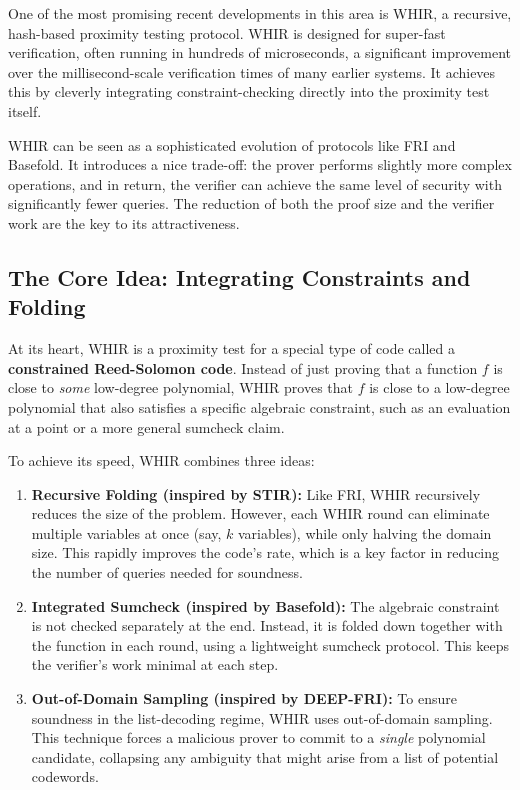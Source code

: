 \documentclass{article}
\begin{document}
One of the most promising recent developments in this area is WHIR, a recursive, hash-based proximity testing protocol. WHIR is designed for super-fast verification, often running in hundreds of microseconds, a significant improvement over the millisecond-scale verification times of many earlier systems. It achieves this by cleverly integrating constraint-checking directly into the proximity test itself.

WHIR can be seen as a sophisticated evolution of protocols like FRI and Basefold. It introduces a nice trade-off: the prover performs slightly more complex operations, and in return, the verifier can achieve the same level of security with significantly fewer queries. The reduction of both the proof size and the verifier work are the key to its attractiveness.

\subsection{The Core Idea: Integrating Constraints and Folding}

At its heart, WHIR is a proximity test for a special type of code called a \textbf{constrained Reed-Solomon code}. Instead of just proving that a function $f$ is close to \textit{some} low-degree polynomial, WHIR proves that $f$ is close to a low-degree polynomial that also satisfies a specific algebraic constraint, such as an evaluation at a point or a more general sumcheck claim.

To achieve its speed, WHIR combines three ideas:
\begin{enumerate}
    \item \textbf{Recursive Folding (inspired by STIR):} Like FRI, WHIR recursively reduces the size of the problem. However, each WHIR round can eliminate multiple variables at once (say, $k$ variables), while only halving the domain size. This rapidly improves the code's rate, which is a key factor in reducing the number of queries needed for soundness.
    \item \textbf{Integrated Sumcheck (inspired by Basefold):} The algebraic constraint is not checked separately at the end. Instead, it is folded down together with the function in each round, using a lightweight sumcheck protocol. This keeps the verifier's work minimal at each step.
    \item \textbf{Out-of-Domain Sampling (inspired by DEEP-FRI):} To ensure soundness in the list-decoding regime, WHIR uses out-of-domain sampling. This technique forces a malicious prover to commit to a \textit{single} polynomial candidate, collapsing any ambiguity that might arise from a list of potential codewords.
\end{enumerate}
\end{document}
